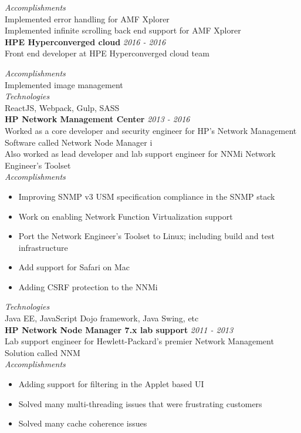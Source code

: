 \documentclass[line,margin]{res}
\begin{document}
\begin{resume}
{\it{Accomplishments}}\\
Implemented error handling for AMF Xplorer\\
Implemented infinite scrolling back end support for AMF Xplorer\\

{\bf HPE Hyperconverged cloud} \hfill {\it{2016 - 2016}}\\
Front end developer at HPE Hyperconverged cloud team

{\it{Accomplishments}}\\
Implemented image management\\

{\it{Technologies}}\\
ReactJS, Webpack, Gulp, SASS\\


{\bf HP Network Management Center} \hfill {\it{2013 - 2016}}\\
Worked as a core developer and security engineer for HP's Network Management Software called Network Node Manager i\\
Also worked as lead developer and lab support engineer for NNMi Network Engineer's Toolset\\

{\it{Accomplishments}}\\
\begin{itemize}
\item Improving SNMP v3 USM specification compliance in the SNMP stack
\item Work on enabling Network Function Virtualization support
\item Port the Network Engineer's Toolset to Linux; including build and test infrastructure
\item Add support for Safari on Mac
\item Adding CSRF protection to the NNMi
\end{itemize}

{\it{Technologies}}\\
Java EE, JavaScript Dojo framework, Java Swing, etc\\

{\bf HP Network Node Manager 7.x lab support} \hfill {\it{2011 - 2013}}\\
Lab support engineer for Hewlett-Packard's premier Network Management Solution called NNM\\

{\it{Accomplishments}}\\
\begin{itemize}
\item Adding support for filtering in the Applet based UI
\item Solved many multi-threading issues that were frustrating customers
\item Solved many cache coherence issues
\end{itemize}



\end{resume}
\end{document}
